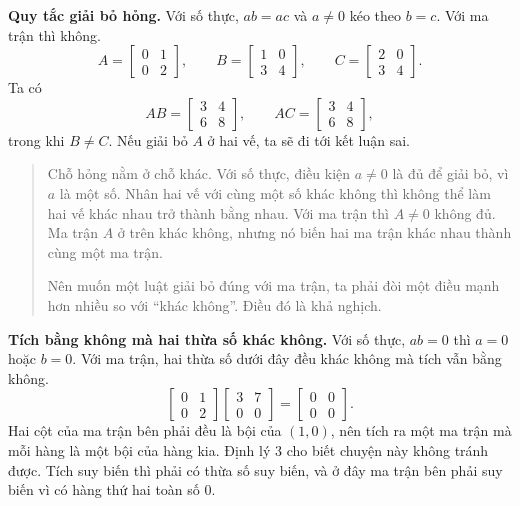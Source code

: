 \documentclass[12pt,a4paper]{article}
\begin{document}
\textbf{Quy tắc giải bỏ hỏng.} Với số thực, \(ab=ac\) và \(a\neq0\) kéo theo \(b=c\). Với ma trận thì không.
$$
A=\left[ \begin{array}{rr} 0 & 1\\ 0 & 2 \end{array} \right],\qquad
B=\left[ \begin{array}{rr} 1 & 0\\ 3 & 4 \end{array} \right],\qquad
C=\left[ \begin{array}{rr} 2 & 0\\ 3 & 4 \end{array} \right].
$$
Ta có
$$
AB=\left[ \begin{array}{rr} 3 & 4\\ 6 & 8 \end{array} \right],\qquad
AC=\left[ \begin{array}{rr} 3 & 4\\ 6 & 8 \end{array} \right],
$$
trong khi \(B\neq C\). Nếu giải bỏ \(A\) ở hai vế, ta sẽ đi tới kết luận sai.

\begin{quote}
Chỗ hỏng nằm ở chỗ khác. Với số thực, điều kiện \(a\neq0\) là đủ để giải bỏ, vì \(a\) là một số. Nhân hai vế với cùng một số khác không thì không thể làm hai vế khác nhau trở thành bằng nhau. Với ma trận thì \(A\neq0\) không đủ. Ma trận \(A\) ở trên khác không, nhưng nó biến hai ma trận khác nhau thành cùng một ma trận.

Nên muốn một luật giải bỏ đúng với ma trận, ta phải đòi một điều mạnh hơn nhiều so với ``khác không''. Điều đó là khả nghịch.
\end{quote}

\textbf{Tích bằng không mà hai thừa số khác không.} Với số thực, \(ab=0\) thì \(a=0\) hoặc \(b=0\). Với ma trận, hai thừa số dưới đây đều khác không mà tích vẫn bằng không.
$$
\left[ \begin{array}{rr} 0 & 1\\ 0 & 2 \end{array} \right]\left[ \begin{array}{rr} 3 & 7\\ 0 & 0 \end{array} \right]=\left[ \begin{array}{rr} 0 & 0\\ 0 & 0 \end{array} \right].
$$
Hai cột của ma trận bên phải đều là bội của \((1,0)\), nên tích ra một ma trận mà mỗi hàng là một bội của hàng kia. Định lý 3 cho biết chuyện này không tránh được. Tích suy biến thì phải có thừa số suy biến, và ở đây ma trận bên phải suy biến vì có hàng thứ hai toàn số \(0\).
\end{document}
